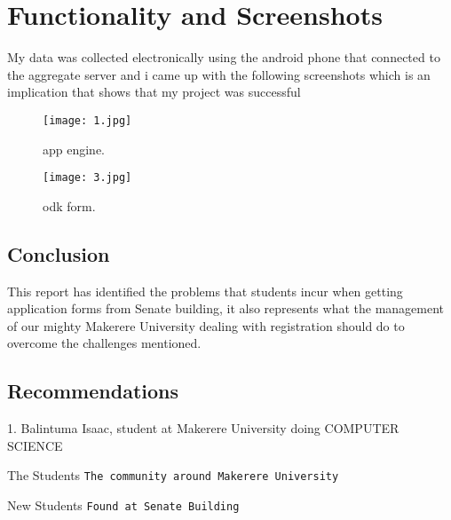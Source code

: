 \documentclass[14pt]{article}
\begin{document}
\section{Functionality and Screenshots}
My data was collected electronically using the android phone that connected to the aggregate server and i came up with the following screenshots which is an implication that shows that my project was successful



\begin{figure}[h!]
\texttt{[image: 1.jpg]}
\caption{app engine.}
\label{figure1}
\end{figure}

\begin{figure}[h!]
\texttt{[image: 3.jpg]}
\caption{odk form.}
\label{figure2}
\end{figure}


\subsection{Conclusion}
This report has identified the problems that students incur when getting application forms from Senate building, it also represents what the management of our mighty Makerere University dealing with registration should do to overcome the challenges mentioned.

\subsection{Recommendations}
1.	Balintuma Isaac, student at Makerere University doing COMPUTER SCIENCE

\begin{thebibliography}{10}
 The Students
  \texttt{The community around Makerere University}

 New Students
  \texttt{Found at Senate Building}

\end{thebibliography}
\end{document}
